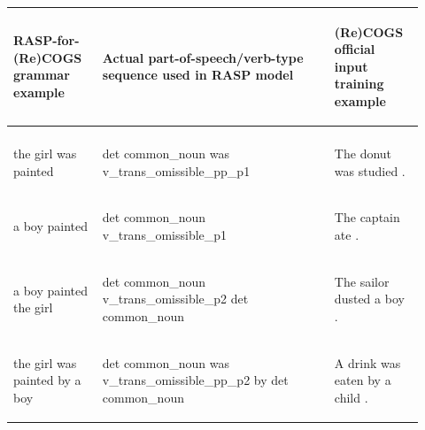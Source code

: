 \documentclass[11pt]{article}
\begin{document}
\clearpage
\onecolumn
\begin{table}
\centering
\begin{tabular}{p{0.2\linewidth} p{0.52\linewidth} p{0.2\linewidth}}
\hline
\begin{small}\textbf{RASP-for-(Re)COGS grammar example}\end{small} & \begin{small}\textbf{Actual part-of-speech/verb-type sequence used in RASP model}\end{small} & \begin{small}\textbf{(Re)COGS official input training example}\end{small}\\
\hline
\begin{small}\end{small} & \begin{small}\end{small} & \begin{small}\end{small} \\
\begin{small}the girl was painted\end{small} & \begin{small}det common\_noun was v\_trans\_omissible\_pp\_p1 \end{small} & \begin{small}The donut was studied .\end{small} \\
\begin{small}a boy painted\end{small} & \begin{small}det common\_noun v\_trans\_omissible\_p1 \end{small} & \begin{small}The captain ate .\end{small} \\
\begin{small}a boy painted the girl\end{small} & \begin{small}det common\_noun v\_trans\_omissible\_p2 det common\_noun \end{small} & \begin{small}The sailor dusted a boy .\end{small} \\
\begin{small}the girl was painted by a boy\end{small} & \begin{small}det common\_noun was v\_trans\_omissible\_pp\_p2 by det common\_noun \end{small} & \begin{small}A drink was eaten by a child .\end{small} \\

\end{tabular}
\end{table}
\end{document}
